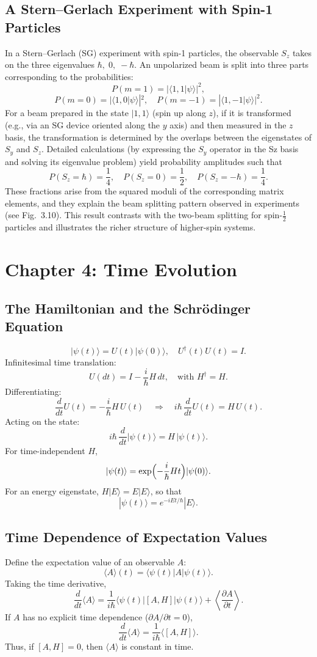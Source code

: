 \documentclass[twocolumn]{article}
\begin{document}
\begin{spacing}{1}
  \subsection{A Stern–Gerlach Experiment with Spin-1 Particles}
  In a Stern–Gerlach (SG) experiment with spin-1 particles, the observable \(S_z\) takes on the three eigenvalues \(\hbar,\;0,\;-\hbar\). An unpolarized beam is split into three parts corresponding to the probabilities:
  \[
  P(m=1)=|\langle1,1|\psi\rangle|^2,
  \]
  \[
   P(m=0)=|\langle1,0|\psi\rangle|^2,\quad P(m=-1)=|\langle1,-1|\psi\rangle|^2.
  \]
  For a beam prepared in the state \(|1,1\rangle\) (spin up along \(z\)), if it is transformed (e.g., via an SG device oriented along the \(y\) axis) and then measured in the \(z\) basis, the transformation is determined by the overlaps between the eigenstates of \(S_y\) and \(S_z\). Detailed calculations (by expressing the \(S_y\) operator in the Sz basis and solving its eigenvalue problem) yield probability amplitudes such that
  \[
  P(S_z=\hbar)=\frac{1}{4},\quad P(S_z=0)=\frac{1}{2},\quad P(S_z=-\hbar)=\frac{1}{4}.
  \]
  These fractions arise from the squared moduli of the corresponding matrix elements, and they explain the beam splitting pattern observed in experiments (see Fig.~3.10). This result contrasts with the two-beam splitting for spin-\(\frac{1}{2}\) particles and illustrates the richer structure of higher-spin systems.
  
  \section{Chapter 4: Time Evolution}

\subsection{The Hamiltonian and the Schrödinger Equation}
\[
|\psi(t)\rangle = U(t)|\psi(0)\rangle,\quad U^\dagger(t)U(t)=I.
\]
Infinitesimal time translation:
\[
U(dt)=I-\frac{i}{\hbar}H\,dt,\quad \text{with } H^\dagger=H.
\]
Differentiating:
\[
\frac{d}{dt}U(t)= -\frac{i}{\hbar}H\,U(t) \quad\Longrightarrow\quad i\hbar\,\frac{d}{dt}U(t)= H\,U(t).
\]
Acting on the state:
\[
i\hbar\,\frac{d}{dt}|\psi(t)\rangle=H\,|\psi(t)\rangle.
\]
For time-independent \(H\),
\[
|\psi(t)\rangle=\exp\Bigl(-\frac{i}{\hbar}Ht\Bigr)|\psi(0)\rangle.
\]
For an energy eigenstate, \(H|E\rangle=E|E\rangle\), so that
\[
|\psi(t)\rangle=e^{-iEt/\hbar}|E\rangle.
\]

\subsection{Time Dependence of Expectation Values}
Define the expectation value of an observable \(A\):
\[
\langle A\rangle (t)=\langle\psi(t)|A|\psi(t)\rangle.
\]
Taking the time derivative,
\[
\frac{d}{dt}\langle A\rangle = \frac{1}{i\hbar}\langle\psi(t)|[A,H]|\psi(t)\rangle + \left\langle\frac{\partial A}{\partial t}\right\rangle.
\]
If \(A\) has no explicit time dependence (\(\partial A/\partial t=0\)),
\[
\frac{d}{dt}\langle A\rangle = \frac{1}{i\hbar}\langle[A,H]\rangle.
\]
Thus, if \([A,H]=0\), then \(\langle A\rangle\) is constant in time.


\end{spacing}
\end{document}
